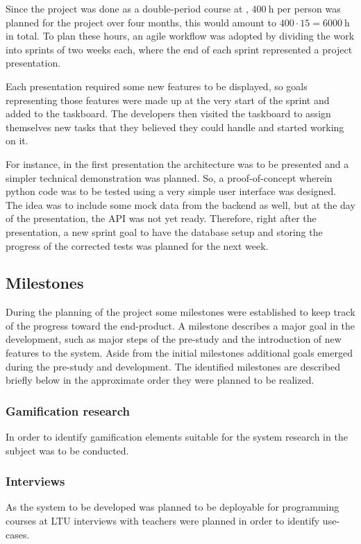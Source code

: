 Since the project was done as a double-period course at \LTU, $\SI{400}{\hour}$ per person was planned for the project over four months, this would amount to $400\cdot15=\SI{6000}{\hour}$ in total. To plan these hours, an agile workflow was adopted by dividing the work into sprints of two weeks each, where the end of each sprint represented a project presentation.

Each presentation required some new features to be displayed, so goals representing those features were made up at the very start of the sprint and added to the taskboard. The developers then visited the taskboard to assign themselves new tasks that they believed they could handle and started working on it.

For instance, in the first presentation the architecture was to be presented and a simpler technical demonstration was planned. So, a proof-of-concept wherein python code was to be tested using a very simple user interface was designed. The idea was to include some mock data from the backend as well, but at the day of the presentation, the API was not yet ready. Therefore, right after the presentation, a new sprint goal to have the database setup and storing the progress of the corrected tests was planned for the next week.

\subsection{Milestones}
During the planning of the project some milestones were established to keep track of the progress toward the end-product. A milestone describes a major goal in the development, such as major steps of the pre-study and the introduction of new features to the system. Aside from the initial milestones additional goals emerged during the pre-study and development. The identified milestones are described briefly below in the approximate order they were planned to be realized.

\subsubsection{Gamification research}
In order to identify gamification elements suitable for the system research in the subject was to be conducted.

\subsubsection{Interviews}
As the system to be developed was planned to be deployable for programming courses at LTU interviews with teachers were planned in order to identify use-cases.


